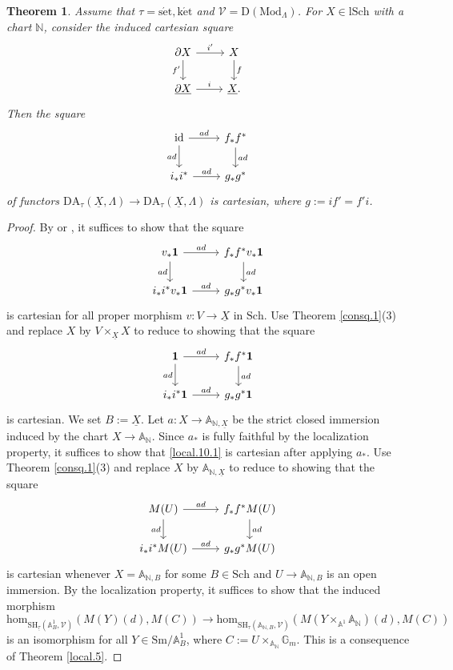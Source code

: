 \documentclass[10pt]{amsart}
\newtheorem{thm}{Theorem}[subsection]
\theoremstyle{definition}
\theoremstyle{remark}
\numberwithin{equation}{subsection}
\newcommand{\A}{\mathbb{A}}
\newcommand{\G}{\mathbb{G}}
\newcommand{\N}{\mathbb{N}}
\newcommand{\cV}{\mathcal{V}}
\newcommand{\id}{\mathrm{id}}
\newcommand{\ul}{\underline}
\newcommand{\Sm}{\mathrm{Sm}}
\newcommand{\SH}{\mathrm{SH}}
\newcommand{\map}{\mathrm{hom}}
\newcommand{\DLambda}{\mathrm{D}(\mathrm{Mod}_{\Lambda})}
\newcommand{\DA}{\mathrm{DA}}
\newcommand{\Sch}{\mathrm{Sch}}
\newcommand{\lSch}{\mathrm{lSch}}
\newcommand{\unit}{\mathbf{1}}
\newcommand{\ketale}{\mathrm{k\acute{e}t}}
\newcommand{\setale}{\mathrm{s\acute{e}t}}
\begin{document}
\begin{thm}
\label{local.10}
Assume that $\tau=\setale,\ketale$ and $\cV=\DLambda$.
For $X\in \lSch$ with a chart $\N$,
consider the induced cartesian square
\[
\begin{tikzcd}
\partial X\ar[d,"f'"']\ar[r,"i'"]&
X\ar[d,"f"]
\\
\ul{\partial X}\ar[r,"i"]&
\ul{X}.
\end{tikzcd}
\]
Then the square
\[
\begin{tikzcd}
\id \ar[r,"ad"]\ar[d,"ad"']&
f_*f^*\ar[d,"ad"]
\\
i_*i^*\ar[r,"ad"]&
g_*g^*
\end{tikzcd}
\]
of functors $\DA_{\tau}(\ul{X},\Lambda)\to \DA_{\tau}(\ul{X},\Lambda)$ is cartesian, where $g:=if'=f'i$.
\end{thm}
\begin{proof}
By \cite[Lemma 2.2.23]{Ayo071} or \cite[Proposition 4.2.13]{CD19}, it suffices to show that the square
\[
\begin{tikzcd}
v_*\unit \ar[r,"ad"]\ar[d,"ad"']&
f_*f^*v_*\unit\ar[d,"ad"]
\\
i_*i^*v_*\unit\ar[r,"ad"]&
g_*g^*v_*\unit
\end{tikzcd}
\]
is cartesian for all proper morphism $v\colon V\to \ul{X}$ in $\Sch$.
Use Theorem \ref{consq.1}(3) and replace $X$ by $V\times_{\ul{X}}X$ to reduce to showing that the square
\begin{equation}
\label{local.10.1}
\begin{tikzcd}
\unit \ar[r,"ad"]\ar[d,"ad"']&
f_*f^*\unit\ar[d,"ad"]
\\
i_*i^*\unit\ar[r,"ad"]&
g_*g^*\unit
\end{tikzcd}
\end{equation}
is cartesian.
We set $B:=\ul{X}$.
Let $a\colon X\to \A_{\N,\ul{X}}$ be the strict closed immersion induced by the chart $X\to \A_{\N}$.
Since $a_*$ is fully faithful by the localization property, it suffices to show that \eqref{local.10.1} is cartesian after applying $a_*$.
Use Theorem \ref{consq.1}(3) and replace $X$ by $\A_{\N,\ul{X}}$ to reduce to showing that the square
\[
\begin{tikzcd}
M(U) \ar[r,"ad"]\ar[d,"ad"']&
f_*f^*M(U)\ar[d,"ad"]
\\
i_*i^*M(U)\ar[r,"ad"]&
g_*g^*M(U)
\end{tikzcd}
\]
is cartesian whenever $X=\A_{\N,B}$ for some $B\in \Sch$ and $U\to \A_{\N,B}$ is an open immersion.
By the localization property, it suffices to show that the induced morphism
\[
\map_{\SH_{\ul{\tau}}(\A_B^1,\cV)}(M(Y)(d),M(C))
\to
\map_{\SH_{\tau}(\A_{\N,B},\cV)}(M(Y\times_{\A^1}\A_{\N})(d),M(C))
\]
is an isomorphism for all $Y\in \Sm/\A_B^1$, where $C:=U\times_{\A_{\N}}\G_m$.
This is a consequence of Theorem \ref{local.5}.
\end{proof}
\end{document}
